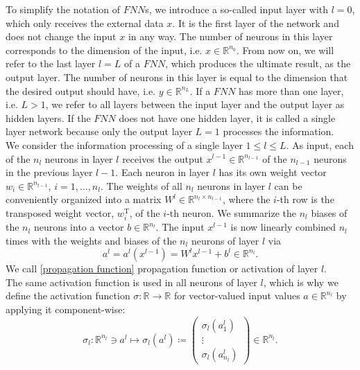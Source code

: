 To simplify the notation of $FNN$s, we introduce a so-called input layer with $l=0$, which only receives the external data $x$. It is the first layer of the network and does not change the input $x$ in any way. The number of neurons in this layer corresponds to the dimension of the input, i.e. $x \in \mathbb{R}^{n_{0}}$. From now on, we will refer to the last layer $l = L$ of a $FNN$, which produces the ultimate result, as the output layer. The number of neurons in this layer is equal to the dimension that the desired output should have, i.e. $y \in \mathbb{R}^{n_{L}}$. If a $FNN$ has more than one layer, i.e. $L>1$, we refer to all layers between the input layer and the output layer as hidden layers. If the $FNN$ does not have one hidden layer, it is called a single layer network because only the output layer $L=1$ processes the information. \\
We consider the information processing of a single layer $1 \leq l \leq L$. As input, each of the $n_l$ neurons in layer $l$ receives the output $x^{l-1} \in \mathbb{R}^{n_{l-1}}$ of the $n_{l-1}$ neurons in the previous layer $l-1$. Each neuron in layer $l$ has its own weight vector $w_i \in \mathbb{R}^{n_{l-1}}$, $i = 1, \ldots, n_l$. The weights of all $n_l$ neurons in layer $l$ can be conveniently organized into a matrix $W^l \in \mathbb{R}^{n_l \times n_{l-1}}$, where the $i$-th row is the transposed weight vector, $w^{\mathrm{T}}_i$, of the $i$-th neuron. We summarize the $n_l$ biases of the $n_l$ neurons into a vector $b \in \mathbb{R}^{n_l}$. The input $x^{l-1}$ is now linearly combined $n_l$ times with the weights and biases of the $n_l$ neurons of layer $l$ via 
\begin{equation}
    \label{propagation function}
    a^l = a^l(x^{l-1}) = W^l x^{l-1} + b^l \in \mathbb{R}^{n_l}.
\end{equation}
We call \cref{propagation function} propagation function or activation of layer $l$. \\
The same activation function is used in all neurons of layer $l$, which is why we define the activation function $\sigma \colon \mathbb{R} \to \mathbb{R}$ for vector-valued input values $a \in \mathbb{R}^{n_l}$ by applying it component-wise:
\begin{equation}
    \label{activation function}
    \sigma_l \colon \mathbb{R}^{n_l} \ni a^l \mapsto \sigma_l (a^l) \coloneqq \left(
        \begin{array}
            {c} \sigma_l \left( a^l_{1} \right) \\
            \vdots \\
            \sigma_l \left( a^l_{n_l} \right)
        \end{array}
        \right) \in \mathbb{R}^{n_l}.
\end{equation}
